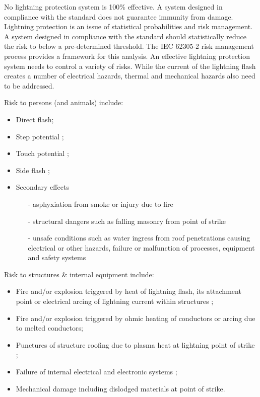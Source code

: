 No lightning protection system is 100\% effective. A system designed in compliance with the standard does not guarantee immunity from damage. Lightning protection is an issue of statistical probabilities and risk management. A system designed in compliance with the standard should statistically reduce the risk to below a pre-determined threshold. The IEC 62305-2 risk management process provides a framework for this analysis. An effective lightning protection system needs to control a variety of risks. While the current of the lightning flash creates a number of electrical hazards, thermal and mechanical hazards also need to be addressed. 

Risk to persons (and animals) include: 

\begin{itemize}
\item Direct flash;
\item  Step potential ;
\item Touch potential ;
\item  Side flash ;
\item Secondary effects

\begin{itemize}
	
	 \item[-]  asphyxiation from smoke or injury due to fire 
	\item [-] structural dangers such as falling masonry from  point of strike 
	\item [-] unsafe conditions such as water ingress from roof  penetrations causing electrical or other hazards,  failure or malfunction of processes, equipment and  safety systems

\end{itemize}
\end{itemize}




Risk to structures \& internal equipment include: 

\begin{itemize}
\item Fire and/or explosion triggered by heat of lightning flash,  its attachment point or electrical arcing of lightning  current within structures ;
\item  Fire and/or explosion triggered by ohmic heating of  conductors or arcing due to melted conductors;
\item Punctures of structure roofing due to plasma heat  at lightning point of strike ;
\item Failure of internal electrical and electronic systems ;
\item Mechanical damage including dislodged materials at  point of strike.
\end{itemize}










